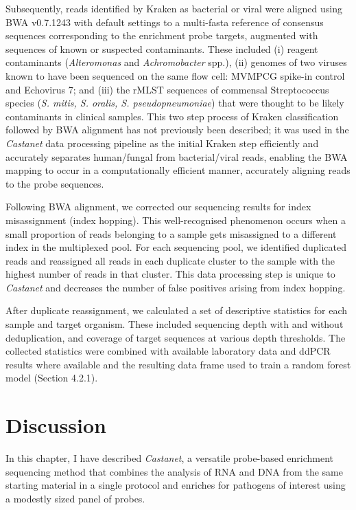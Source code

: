 Subsequently, reads identified by Kraken as bacterial or viral were aligned using BWA v0.7.1243 with default settings to a multi-fasta reference of consensus sequences corresponding to the enrichment probe targets, augmented with sequences of known or suspected contaminants. These included (i) reagent contaminants (\textit{Alteromonas} and \textit{Achromobacter} spp.), (ii) genomes of two viruses known to have been sequenced on the same flow cell: MVMPCG spike-in control and Echovirus 7; and (iii) the rMLST sequences of commensal Streptococcus species (\textit{S. mitis, S. oralis, S. pseudopneumoniae}) that were thought to be likely contaminants in clinical samples. This two step process of Kraken classification followed by BWA alignment has not previously been described; it was used in the \textit{Castanet} data processing pipeline as the initial Kraken step efficiently and accurately separates human/fungal from bacterial/viral reads, enabling the BWA mapping to occur in a computationally efficient manner, accurately aligning reads to the probe sequences. 

Following BWA alignment, we corrected our sequencing results for index misassignment (index hopping). This well-recognised phenomenon occurs when a small proportion of reads belonging to a sample gets misassigned to a different index in the multiplexed pool. For each sequencing pool, we identified duplicated reads and reassigned all reads in each duplicate cluster to the sample with the highest number of reads in that cluster. This data processing step is unique to \textit{Castanet} and decreases the number of false positives arising from index hopping.

After duplicate reassignment, we calculated a set of descriptive statistics for each sample and target organism. These included sequencing depth with and without deduplication, and coverage of target sequences at various depth thresholds. The collected statistics were combined with available laboratory data and ddPCR results where available and the resulting data frame used to train a random forest model (Section 4.2.1). 

\section{Discussion}
In this chapter, I have described \textit{Castanet}, a versatile probe-based enrichment sequencing method that combines the analysis of RNA and DNA from the same starting material in a single protocol and enriches for pathogens of interest using a modestly sized panel of probes.

